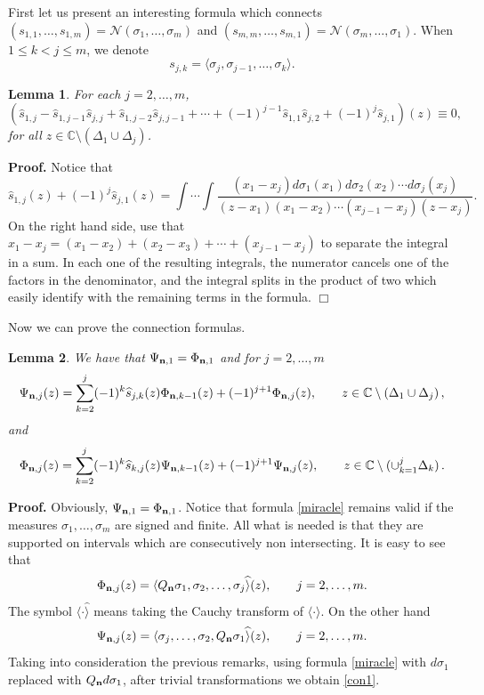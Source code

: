 \documentclass{amsart}
\newtheorem{lemma}{\sc Lemma}[section]
\theoremstyle{definition}
\theoremstyle{remark}
\newcommand{\bbc}{\Bbb{C}}
\begin{document}
First let us present an interesting formula which connects $(s_{1,1},\ldots,s_{1,m}) = \mathcal{N}(\sigma_1,\ldots,\sigma_m)$ and  $(s_{m,m},\ldots,s_{m,1}) = \mathcal{N}(\sigma_m,\ldots,\sigma_1)$. When $1\leq k < j \leq m$, we denote
\[ s_{j,k} = \langle \sigma_j,\sigma_{j-1},\ldots,\sigma_k\rangle.
\]

\begin{lemma} \label{milagro}
For each $j=2,\ldots,m$,
\begin{equation} \label{miracle}
(\widehat{s}_{1,j} - \widehat{s}_{1,j-1}\widehat{s}_{j,j} + \widehat{s}_{1,j-2}\widehat{s}_{j,j-1} + \cdots + (-1)^{j-1} \widehat{s}_{1,1}\widehat{s}_{j,2} +(-1)^j \widehat{s}_{j,1})(z) \equiv 0,
\end{equation}
for all $z \in \mathbb{C} \setminus (\Delta_1 \cup \Delta_j)$.
\end{lemma}
{\bf Proof.} Notice that
\[ \widehat{s}_{1,j}(z) + (-1)^j \widehat{s}_{j,1}(z) = \int \cdots \int \frac{(x_1 - x_j)d\sigma_1(x_1)d\sigma_2(x_2)\cdots d\sigma_j(x_j)}{(z-x_1)(x_1-x_2) \cdots (x_{j-1}-x_j)(z-x_j)}.
\]
On the right hand side, use that $x_1-x_j = (x_1 - x_2) + (x_2 - x_3) + \cdots + (x_{j-1} - x_j)$ to separate the integral in a sum. In each one of the resulting integrals, the numerator cancels one of the factors in the denominator, and the integral splits in the product of two which easily identify  with the remaining terms in the formula. \hfill $\Box$

Now we can prove the connection formulas.

\begin{lemma} \label{connection}
We have that $\Psi_{{\bf n},1} = \Phi_{{\bf n},1}$ and for $j = 2,\ldots,m$
\begin{equation} \label{con1}
\Psi_{{\bf n},j}(z)=
\sum_{k=2}^{j} (-1)^{k} \widehat{s}_{j,k}(z)
 {\Phi}_{ {\bf n},k-1}(z) + (-1)^{j+1} {\Phi}_{ {\bf n},j}(z), \qquad z \in {\bbc}
\setminus  (\Delta_1 \cup \Delta_j) \,,
\end{equation}
and
\begin{equation} \label{con2}
\Phi_{{\bf n},j}(z)=
\sum_{k=2}^{j} (-1)^{k} \widehat{s}_{k,j}(z)
 {\Psi}_{ {\bf n},k-1}(z) + (-1)^{j+1} {\Psi}_{ {\bf n},j}(z), \qquad z \in {\bbc}
\setminus   (\cup_{k=1}^j \Delta_k) \,.
\end{equation}
\end{lemma}

{\bf Proof.} Obviously, $\Psi_{{\bf n},1} = \Phi_{{\bf n},1}$. Notice that formula \eqref{miracle} remains valid if the measures $\sigma_1,\ldots,\sigma_m$ are signed and finite. All what is needed  is that they are supported on intervals which are consecutively non intersecting. It is easy to see that
\[ \Phi_{{\bf n},j}(z) = \langle Q_{\bf n}\sigma_1,\sigma_2,\ldots,\sigma_j \widehat{\rangle} (z), \qquad j=2,\ldots,m.
\]
The symbol $\langle \cdot \widehat{\rangle}$ means taking the Cauchy transform of $\langle \cdot {\rangle}$. On the other hand
\[ \Psi_{{\bf n},j}(z) = \langle \sigma_j, \ldots,\sigma_2, Q_{\bf n}\sigma_1\widehat{\rangle}(z), \qquad j=2,\ldots,m.
\]
Taking into consideration the previous remarks, using formula \eqref{miracle} with $d\sigma_1$ replaced with $Q_{\bf n} d \sigma_1$, after trivial transformations we obtain \eqref{con1}.
\end{document}
